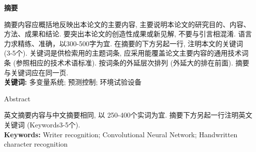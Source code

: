 \documentclass[a4paper]{article}
\begin{document}
\setcounter{page}{1}
\begin{center}
\bfseries
 摘\quad 要
\end{center}
\thispagestyle{plain}
\begin{spacing}{1.5}
摘要内容应概括地反映出本论文的主要内容, 主要说明本论文的研究目的、内容、方法、成果和结论. 要突出本论文的创造性成果或新见解, 不要与引言相混淆. 语言力求精练、准确，以300-500字为宜. 在摘要的下方另起一行, 注明本文的关键词 (3-5个). 关键词是供检索用的主题词条, 应采用能覆盖论文主要内容的通用技术词条 (参照相应的技术术语标准). 按词条的外延层次排列 (外延大的排在前面). 摘要与关键词应在同一页.
\ \\
\textbf{关键词: }多变量系统; 预测控制; 环境试验设备
\end{spacing}
\pagebreak[4]
\thispagestyle{plain}

\begin{center}
Abstract
\end{center}
\begin{spacing}{1.5}
英文摘要内容与中文摘要相同, 以 250-400个实词为宜. 摘要下方另起一行注明英文关键词 (Keywords3-5个).
\ \\
\textbf{Keywords: }Writer recognition; Convolutional Neural Network; Handwritten character recognition
\end{spacing}
\pagebreak[4]

\thispagestyle{plain}
\begin{spacing}{1.5}
\tableofcontents
\end{spacing}
\thispagestyle{plain}
\pagebreak[4]
\end{document}
